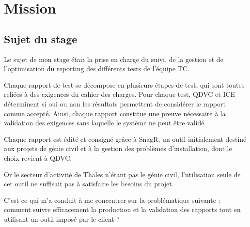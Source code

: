 \chapter{Mission}

\section{Sujet du stage}
Le sujet de mon stage était la prise en charge du suivi, de la gestion et de l'optimisation du \gls{reporting} des différents tests de l'équipe \gls{TC}.

Chaque rapport de test se décompose en plusieurs étapes de test, qui sont toutes reliées à des exigences du cahier des charges. Pour chaque test, QDVC et ICE déterminent si oui ou non les résultats permettent de considérer le rapport comme accepté. Ainsi, chaque rapport constitue une preuve nécessaire à la validation des exigences sans laquelle le système ne peut être validé.

Chaque rapport est édité et consigné grâce à \gls{SnagR}, un outil initialement destiné aux projets de génie civil et à la gestion des problèmes d'installation, dont le choix revient à QDVC.

Or le secteur d'activité de Thales n'étant pas le génie civil, l'utilisation seule de cet outil ne suffisait pas à satisfaire les besoins du projet.

C'est ce qui m'a conduit à me concentrer sur la problématique suivante : comment suivre efficacement la production et la validation des rapports tout en utilisant un outil imposé par le client ?


